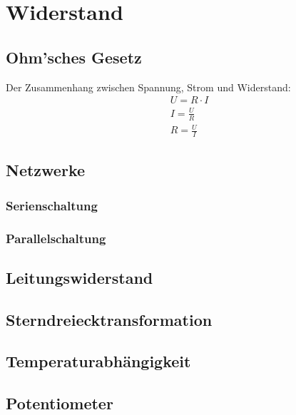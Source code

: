 \chapter{Widerstand}

\section{Ohm'sches Gesetz}
Der Zusammenhang zwischen Spannung, Strom und Widerstand:
\begin{align}
    &U = R\cdot I       \\
    &I = \frac{U}{R}    \\
    &R = \frac{U}{I}
\end{align}

\section{Netzwerke}
\subsection{Serienschaltung}
\subsection{Parallelschaltung}
\section{Leitungswiderstand}
\section{Sterndreiecktransformation}
\section{Temperaturabhängigkeit}
\section{Potentiometer}